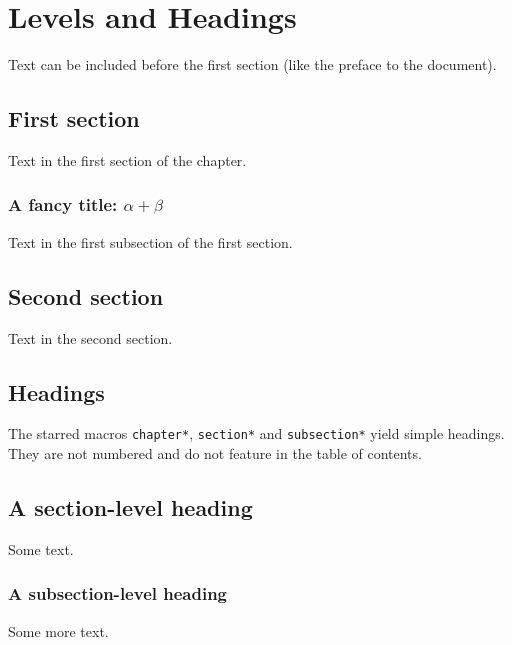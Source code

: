 
\chapter{Levels and Headings}\label{ch:levels}

Text can be included before the first section (like the preface to the document).

\section{First section}\label{sec:first}
Text in the first section of the chapter.

\subsection{A fancy title: $\alpha + \beta$}\label{subsec:fancy}
Text in the first subsection of the first section.

\section{Second section}\label{sec:second}
Text in the second section.

\section{Headings}
The starred macros \texttt{chapter*}, \texttt{section*} and \texttt{subsection*} yield simple headings. They are not numbered and do not feature in the table of contents. 

\section*{A section-level heading}
Some text.

\subsection*{A subsection-level heading}
Some more text.
\endinput

